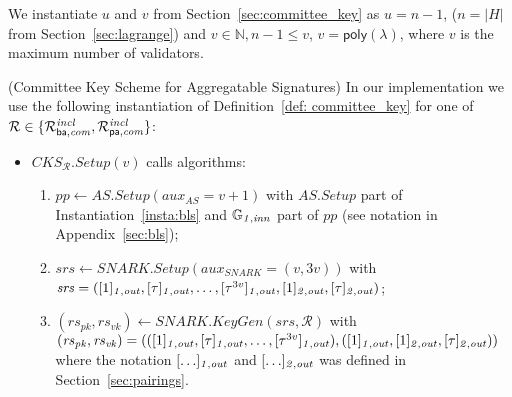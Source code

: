 We instantiate $u$ and $v$ from Section~\ref{sec:committee_key} as $u = n-1$, ($n=|H|$ from 
Section~\ref{sec:lagrange}) and $v \in \mathbb{N}, n-1 \leq v$, $v = \mathsf{poly}(\lambda)$, where $v$ is the 
maximum number of validators.

\begin{construction}(Committee Key Scheme for Aggregatable Signatures)
\label{inst:cks} In our implementation we use the following instantiation of Definition~\ref{def: committee_key} for one of $\mathcal{R} \in \{\mathcal{R}^{\mathit{incl}}_{\mathsf{ba},\mathit{com}}, \mathcal{R}^{\mathit{incl}}_{\mathsf{pa},\mathit{com}}\}$:
\begin{itemize}
\item $\mathit{CKS_{\mathcal{R}}.Setup}(v)$ calls algorithms: 
\begin{enumerate}
\item $\mathit{pp} \leftarrow \mathit{AS.Setup}(\mathit{aux_{\mathit{AS}}}= v+1)$ with $\mathit{AS.Setup}$ part of Instantiation~\ref{insta:bls} and 
$\mathbb{G}_{\mathit{1,inn}}$ part of $\mathit{pp}$ (see notation in Appendix~\ref{sec:bls});
\item $\mathit{srs} \leftarrow \mathit{SNARK.Setup}(\mathit{aux_{\mathit{SNARK}}} = (v, 3v))$ with \\
$\mathit{srs}=([1]_{\mathit{1,out}}, [\tau]_{\mathit{1,out}}, \ldots, [\tau^{3v}]_{\mathit{1,out}}, [1]_{\mathit{2,out}}, [\tau]_{\mathit{2,out}})$;
\item $(\mathit{rs}_{\mathit{pk}}, \mathit{rs}_{\mathit{vk}}) \leftarrow \mathit{SNARK.KeyGen}(\mathit{srs}, \mathcal{R})$ with \\
$(\mathit{rs}_{\mathit{pk}}, \mathit{rs}_{\mathit{vk}}) =  (([1]_{\mathit{1,out}}, [\tau]_{\mathit{1,out}}, \ldots, [\tau^{3v}]_{\mathit{1,out}}), 
([1]_{\mathit{1,out}}, [1]_{\mathit{2,out}}, [\tau]_{\mathit{2,out}}))$ where %
the notation $[\ldots]_{\mathit{1,out}}$ and $[\ldots]_{\mathit{2,out}}$ was defined in Section~\ref{sec:pairings}.
\end{enumerate}


\end{itemize}
\end{construction}
